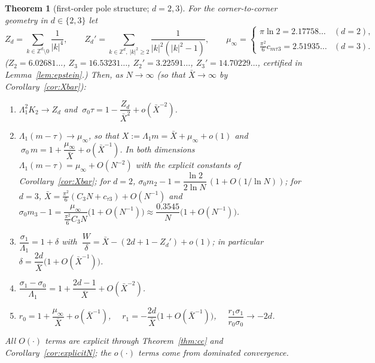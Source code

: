 \documentclass[11pt,a4paper]{article}
\newcommand{\Z}{\mathbb Z}
\newcommand{\Xb}{\bar X}
\theoremstyle{plain}
\newtheorem{theorem}{Theorem}[section]
\theoremstyle{definition}
\numberwithin{equation}{section}
\begin{document}
\begin{theorem}[first-order pole structure; $d=2,3$]\label{thm:asym}
For the corner-to-corner geometry in $d\in\{2,3\}$ let
\[
Z_d=\sum_{k\in\Z^d\setminus0}\frac{1}{|k|^4},\qquad Z_d'=\sum_{k\in\Z^d,\ |k|^2\ge2}\frac{1}{|k|^2(|k|^2-1)},\qquad
\mu_\infty=\begin{cases}\pi\ln2=2.17758\ldots&(d=2),\\[2pt] \frac{\pi^2}{6}c_{m\tau3}=2.51935\ldots&(d=3).\end{cases}
\]
($Z_2=6.02681\ldots$, $Z_3=16.53231\ldots$, $Z_2'=3.22591\ldots$, $Z_3'=14.70229\ldots$, certified in Lemma~\ref{lem:epstein}.) Then, as $N\to\infty$ (so that $\Xb\to\infty$ by Corollary~\ref{cor:Xbar}):
\begin{enumerate}
\item[(a)] $\Lambda_1^2K_2\to Z_d$ and $\ \sigma_0\tau=1-\dfrac{Z_d}{\Xb^2}+o(\Xb^{-2})$.
\item[(b)] $\Lambda_1(m-\tau)\to\mu_\infty$, so that $X:=\Lambda_1m=\Xb+\mu_\infty+o(1)$ and
$\ \sigma_0\,m=1+\dfrac{\mu_\infty}{\Xb}+o(\Xb^{-1})$. In both dimensions $\Lambda_1(m-\tau)=\mu_\infty+O(N^{-2})$ with the explicit constants of Corollary~\ref{cor:Xbar}; for $d=2$, $\sigma_0m_2-1=\dfrac{\ln2}{2\ln N}\,(1+O(1/\ln N))$; for $d=3$, $\Xb=\frac{\pi^2}{6}(C_3N+c_{\tau3})+O(N^{-1})$ and $\sigma_0m_3-1=\dfrac{\mu_\infty}{\frac{\pi^2}{6}C_3N}\big(1+O(N^{-1})\big)\approx\dfrac{0.3545}{N}\big(1+O(N^{-1})\big)$.
\item[(c)] $\dfrac{\sigma_1}{\Lambda_1}=1+\delta$ with $\ \dfrac W\delta=\Xb-(2d+1-Z_d')+o(1)$; in particular $\delta=\dfrac{2d}{\Xb}\big(1+O(\Xb^{-1})\big)$.
\item[(d)] $\dfrac{\sigma_1-\sigma_0}{\Lambda_1}=1+\dfrac{2d-1}{\Xb}+O(\Xb^{-2})$.
\item[(e)] $r_0=1+\dfrac{\mu_\infty}{\Xb}+o(\Xb^{-1})$, $\quad r_1=-\dfrac{2d}{\Xb}\big(1+O(\Xb^{-1})\big)$, $\quad\dfrac{r_1\sigma_1}{r_0\sigma_0}\to-2d$.
\end{enumerate}
All $O(\cdot)$ terms are explicit through Theorem~\ref{thm:cc} and Corollary~\ref{cor:explicitN}; the $o(\cdot)$ terms come from dominated convergence.
\end{theorem}
\end{document}
